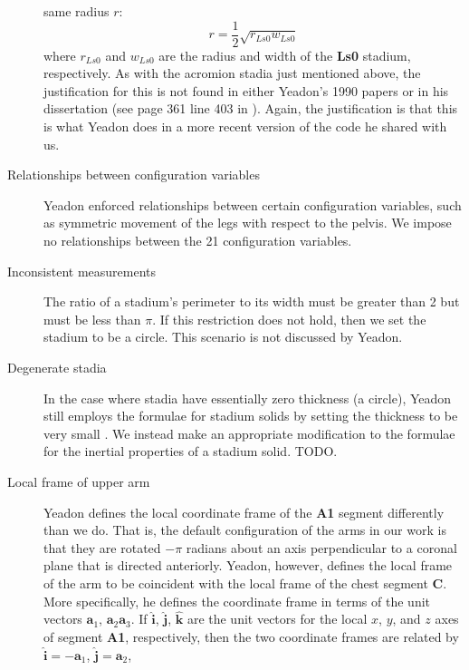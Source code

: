 \documentclass[10pt]{article}
\begin{document}
\begin{description}
        same radius $r$:
        \begin{equation}
            r = \frac{1}{2}\sqrt{r_{Ls0} w_{Ls0}}
        \end{equation}
        where $r_{Ls0}$ and $w_{Ls0}$ are the radius and width of the
        \textbf{Ls0} stadium, respectively. As with the acromion stadia just
        mentioned above, the justification for this is not found in either
        Yeadon's 1990 papers or in his dissertation (see page 361 line 403 in
        \cite{Yeadon1984a}). Again, the justification is that this is what
        Yeadon does in a more recent version of the code he shared with us.
    \item[Relationships between configuration variables] Yeadon enforced
        relationships between certain configuration variables, such as
        symmetric movement of the legs with respect to the pelvis. We impose no
        relationships between the 21 configuration variables.
    \item[Inconsistent measurements] The ratio of a stadium's perimeter to its
        width must be greater than 2 but must be less than $\pi$. If this
        restriction does not hold, then we set the stadium to be a circle. This
        scenario is not discussed by Yeadon.
    \item[Degenerate stadia] In the case where stadia have essentially zero
        thickness (a circle), Yeadon still employs the formulae for stadium
        solids by setting the thickness to be very small \cite{Yeadon1990f}. We
        instead make an appropriate modification to the formulae for the
        inertial properties of a stadium solid. TODO.
    \item[Local frame of upper arm] Yeadon defines the local coordinate frame
        of the \textbf{A1} segment differently than we do. That is, the default
        configuration of the arms in our work is that they are rotated $-\pi$
        radians about an axis perpendicular to a coronal plane that is directed
        anteriorly. Yeadon, however, defines the local frame of the arm to be
        coincident with the local frame of the chest segment \textbf{C}. More
        specifically, he defines the coordinate frame in terms of the unit
        vectors $\mathbf{a}_1$, $\mathbf{a}_2$$\mathbf{a}_3$. If
        $\mathbf{\hat{i}}$, $\mathbf{\hat{j}}$, $\mathbf{\hat{k}}$ are the unit
        vectors for the local $x$, $y$, and $z$ axes of segment \textbf{A1},
        respectively, then the two coordinate frames are related by
        $\mathbf{\hat{i}} = -\mathbf{a}_1$, $\mathbf{\hat{j}} = \mathbf{a}_2$,
$$
\end{description}
\end{document}
